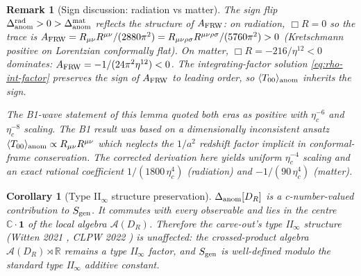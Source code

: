\documentclass[11pt]{article}
\newtheorem{remark}[lemma]{Remark}
\newtheorem{corollary}[lemma]{Corollary}
\begin{document}
\begin{remark}[Sign discussion: radiation vs matter]\label{rem:sign}
The sign flip $\Delta_{\rm anom}^{\rm rad}>0>\Delta_{\rm anom}^{\rm mat}$
reflects the structure of $A_{\rm FRW}$: on radiation,
$\Box R=0$ so the trace is $A_{\rm FRW}=R_{\mu\nu}R^{\mu\nu}/(2880\pi^2)
=R_{\mu\nu\rho\sigma}R^{\mu\nu\rho\sigma}/(5760\pi^2)>0$ (Kretschmann
positive on Lorentzian conformally flat).  On matter,
$\Box R=-216/\eta^{12}<0$ dominates: $A_{\rm FRW}=-1/(24\pi^2\eta^{12})<0$.
The integrating-factor solution \eqref{eq:rho-int-factor} preserves
the sign of $A_{\rm FRW}$ to leading order, so $\langle T_{00}\rangle_{\rm anom}$
inherits the sign.

The B1-wave statement of this lemma quoted both eras as positive with
$\eta_c^{-6}$ and $\eta_c^{-8}$ scaling.  The B1 result was based on a
dimensionally inconsistent ansatz
$\langle T_{00}\rangle_{\rm anom}\propto R_{\mu\nu}R^{\mu\nu}$ which
neglects the $1/a^2$ redshift factor implicit in conformal-frame
conservation.  The corrected derivation here yields uniform
$\eta_c^{-4}$ scaling and an exact rational coefficient
$1/(1800\,\eta_c^4)$ (radiation) and $-1/(90\,\eta_c^4)$ (matter).
\end{remark}

\begin{corollary}[Type II$_\infty$ structure preservation]\label{cor:typeII}
$\Delta_{\rm anom}[D_R]$ is a c-number-valued contribution to
$S_{\rm gen}$.  It commutes with every observable and lies in the
centre $\mathbb{C}\!\cdot\!\mathbf{1}$ of the local algebra
$\mathcal{A}(D_R)$.  Therefore the carve-out's type II$_\infty$
structure (Witten 2021 \cite{Witten2021}, CLPW 2022 \cite{CLPW2022})
is unaffected: the crossed-product algebra
$\mathcal{A}(D_R)\rtimes\mathbb{R}$ remains a type II$_\infty$
factor, and $S_{\rm gen}$ is well-defined modulo the standard
type II$_\infty$ additive constant.
\end{corollary}
\end{document}
